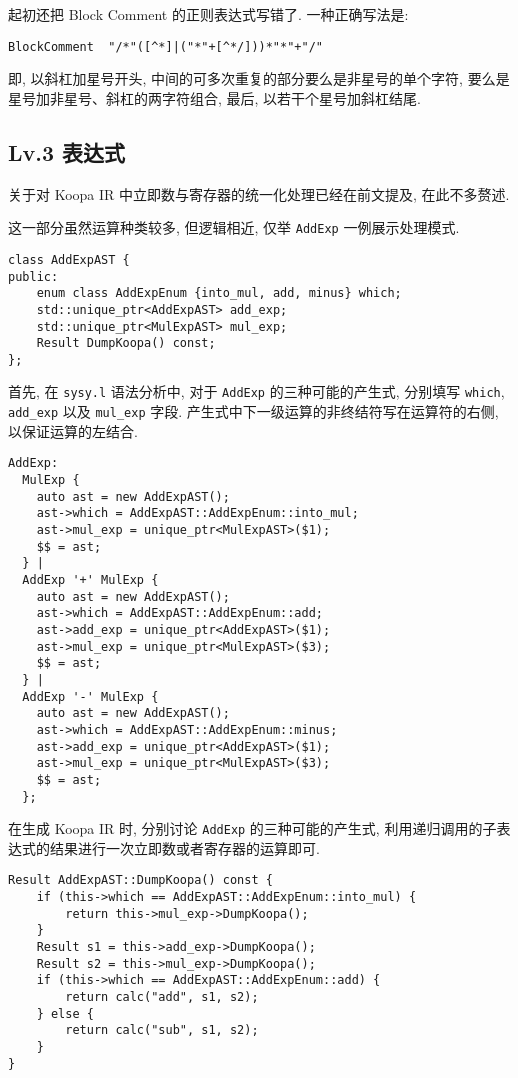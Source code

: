 \documentclass[8pt]{article}
\theoremstyle{compact}
\begin{document}
起初还把 Block Comment 的正则表达式写错了. 一种正确写法是: \begin{verbatim}
BlockComment  "/*"([^*]|("*"+[^*/]))*"*"+"/"
\end{verbatim}

即, 以斜杠加星号开头, 中间的可多次重复的部分要么是非星号的单个字符, 要么是星号加非星号、斜杠的两字符组合, 最后, 以若干个星号加斜杠结尾.

\subsection{Lv.3 表达式}
关于对 Koopa IR 中立即数与寄存器的统一化处理已经在前文提及, 在此不多赘述.

这一部分虽然运算种类较多, 但逻辑相近, 仅举 \texttt{AddExp} 一例展示处理模式.

\begin{verbatim}
class AddExpAST {
public:
    enum class AddExpEnum {into_mul, add, minus} which;
    std::unique_ptr<AddExpAST> add_exp;
    std::unique_ptr<MulExpAST> mul_exp;
    Result DumpKoopa() const;
};
\end{verbatim}

首先, 在 \texttt{sysy.l} 语法分析中, 对于 \texttt{AddExp} 的三种可能的产生式, 分别填写 \texttt{which}, \texttt{add\_exp} 以及 \texttt{mul\_exp} 字段. 产生式中下一级运算的非终结符写在运算符的右侧, 以保证运算的左结合.

\begin{verbatim}
AddExp:
  MulExp {
    auto ast = new AddExpAST();
    ast->which = AddExpAST::AddExpEnum::into_mul;
    ast->mul_exp = unique_ptr<MulExpAST>($1);
    $$ = ast;
  } | 
  AddExp '+' MulExp {
    auto ast = new AddExpAST();
    ast->which = AddExpAST::AddExpEnum::add;
    ast->add_exp = unique_ptr<AddExpAST>($1);
    ast->mul_exp = unique_ptr<MulExpAST>($3);
    $$ = ast;
  } |
  AddExp '-' MulExp {
    auto ast = new AddExpAST();
    ast->which = AddExpAST::AddExpEnum::minus;
    ast->add_exp = unique_ptr<AddExpAST>($1);
    ast->mul_exp = unique_ptr<MulExpAST>($3);
    $$ = ast;
  };
\end{verbatim}

在生成 Koopa IR 时, 分别讨论 \texttt{AddExp} 的三种可能的产生式, 利用递归调用的子表达式的结果进行一次立即数或者寄存器的运算即可.

\begin{verbatim}
Result AddExpAST::DumpKoopa() const {
    if (this->which == AddExpAST::AddExpEnum::into_mul) {
        return this->mul_exp->DumpKoopa();
    }
    Result s1 = this->add_exp->DumpKoopa();
    Result s2 = this->mul_exp->DumpKoopa();
    if (this->which == AddExpAST::AddExpEnum::add) {
        return calc("add", s1, s2);
    } else {
        return calc("sub", s1, s2);
    }
}
\end{verbatim}
\end{document}
